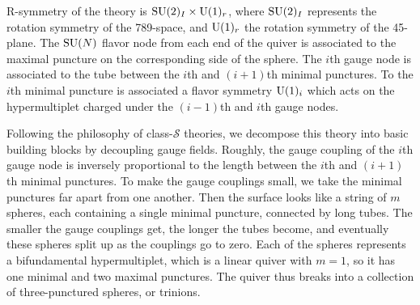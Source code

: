 R-symmetry of the theory is $\mathrm{SU}(2)_{I} \times \mathrm{U}(1)_{r}$, where $\mathrm{SU}(2)_{I}$
represents the rotation symmetry of the 789-space, and $\mathrm{U}(1)_{r}$
the rotation symmetry of the 45-plane. The $\mathrm{SU}(N)$ flavor node from
each end of the quiver is associated to the maximal puncture on the
corresponding side of the sphere. The $i$th gauge node is associated
to the tube between the $i$th and $(i+1)$th minimal punctures. To
the $i$th minimal puncture is associated a flavor symmetry $\mathrm{U}(1)_{i}$
which acts on the hypermultiplet charged under the $(i-1)$th and
$i$th gauge nodes. 

Following the philosophy of class-$\mathcal{S}$ theories, we decompose
this theory into basic building blocks by decoupling gauge fields.
Roughly, the gauge coupling of the $i$th gauge node is inversely
proportional to the length between the $i$th and $(i+1)$th minimal
punctures. To make the gauge couplings small, we take the minimal
punctures far apart from one another. Then the surface looks like
a string of $m$ spheres, each containing a single minimal puncture,
connected by long tubes. The smaller the gauge couplings get, the
longer the tubes become, and eventually these spheres split up as
the couplings go to zero. Each of the spheres represents a bifundamental
hypermultiplet, which is a linear quiver with $m=1$, so it has one
minimal and two maximal punctures. The quiver thus breaks into a collection
of three-punctured spheres, or trinions. 


